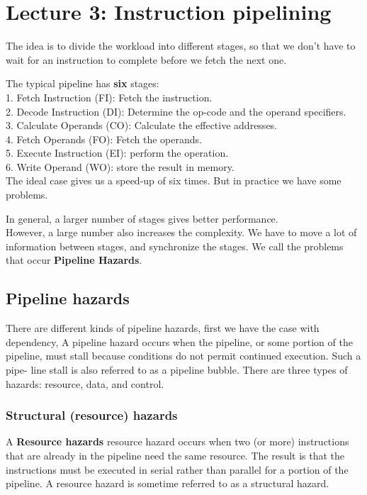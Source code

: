 \section{Lecture 3: Instruction pipelining}
The idea is to divide the workload into different stages, so that we don't have to wait for an instruction to complete before we fetch the next one.

The typical pipeline has \textbf{six} stages: \\
1. Fetch Instruction (FI): Fetch the instruction.\\
2. Decode Instruction (DI): Determine the op-code and the operand specifiers.\\
3. Calculate Operands (CO): Calculate the effective addresses.\\
4. Fetch Operands (FO): Fetch the operands.\\
5. Execute Instruction (EI): perform the operation.\\
6. Write Operand (WO): store the result in memory.\\

The ideal case gives us a speed-up of six times. But in practice we have some problems.

In general, a larger number of stages gives better performance. \\
However, a large number also increases the complexity. We have to  move a lot of information between stages, and synchronize the stages. We call the problems that occur \textbf{Pipeline Hazards}.

\subsection{Pipeline hazards}
There are different kinds of pipeline hazards, first we have the case with dependency, A pipeline hazard occurs when the pipeline, or some portion of the pipeline, must stall because conditions do not permit continued execution. Such a pipe- line stall is also referred to as a pipeline bubble. There are three types of hazards: resource, data, and control. \\

\subsubsection{Structural (resource) hazards}
A \textbf{Resource hazards} resource hazard occurs when two (or more) instructions that are already in the pipeline need the same resource. The result is that the instructions must be executed in serial rather than parallel for a portion of the pipeline. A resource hazard is sometime referred to as a structural hazard.

